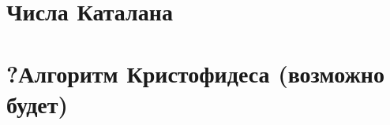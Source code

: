 \documentclass[12pt, fleqn]{article}
\begin{document}
  

  

  

  

  

  

  

  

  

  

  

  \section{Числа Каталана}
  

  \section{?Алгоритм Кристофидеса (возможно будет)}
\end{document}
